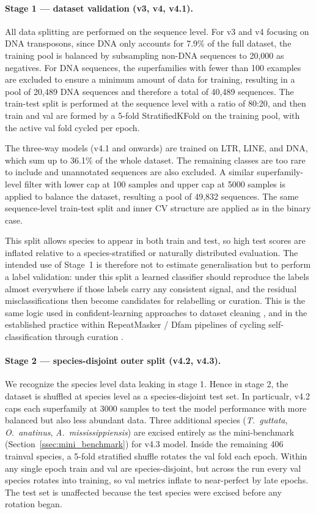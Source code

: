 \documentclass[12pt]{article}
\begin{document}
\paragraph{Stage 1 --- dataset validation (v3, v4, v4.1).} All data splitting are performed on the sequence level. For v3 and v4 focusing on DNA transposons, since DNA only accounts for 7.9\% of the full dataset, the training pool is balanced by subsampling non-DNA sequences to 20{,}000 as negatives. For DNA sequences, the superfamilies with fewer than 100 examples are excluded to ensure a minimum amount of data for training, resulting in a pool of 20{,}489 DNA sequences and therefore a total of 40{,}489 sequences. The train-test split is performed at the sequence level with a ratio of 80:20, and then train and val are formed by a 5-fold StratifiedKFold on the training pool, with the active val fold cycled per epoch. 

The three-way models (v4.1 and onwards) are trained on  LTR, LINE, and DNA, which sum up to 36.1\% of the whole dataset. The remaining classes are too rare to include and unannotated sequences are also excluded. A similar superfamily-level filter with lower cap at 100 samples and upper cap at 5000 samples is applied to balance the dataset, resulting a pool of 49{,}832 sequences. The same sequence-level train-test split and inner CV structure are applied as in the binary case. 

This split allows species to appear in both train and test, so high test scores are inflated relative to a species-stratified or naturally distributed evaluation. The intended use of Stage~1 is therefore not to estimate generalisation but to perform a label validation: under this split a learned classifier should reproduce the labels almost everywhere if those labels carry any consistent signal, and the residual misclassifications then become candidates for relabelling or curation. This is the same logic used in confident-learning approaches to dataset cleaning \cite{northcutt2021confident}, and in the established practice within RepeatMasker / Dfam pipelines of cycling self-classification through curation \cite{storer2021dfam,flynn2020repeatmodeler2}.

\paragraph{Stage 2 --- species-disjoint outer split (v4.2, v4.3).} We recognize the species level data leaking in stage 1. Hence in stage 2, the dataset is shuffled at species level as a species-disjoint test set. In particualr, v4.2 caps each superfamily at 3000 samples to test the
model performance with more balanced but also less abundant data. Three additional species (\textit{T.~guttata}, \textit{O.~anatinus}, \textit{A.~mississippiensis}) are excised entirely as the mini-benchmark (Section~\ref{ssec:mini_benchmark}) for v4.3 model. Inside the remaining 406 trainval species, a 5-fold stratified shuffle rotates the val fold each epoch. Within any single epoch train and val are species-disjoint, but across the run every val species rotates into training, so val metrics inflate to near-perfect by late epochs. The test set is unaffected because the test species were excised before any rotation began. 
\end{document}
